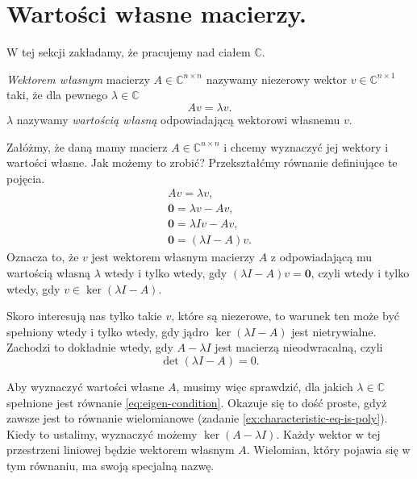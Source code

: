 \section{Wartości własne macierzy.}

W tej sekcji zakładamy, że pracujemy nad ciałem $\mathbb{C}$.


\begin{definition}
	\textit{Wektorem własnym} macierzy $A \in \mathbb{C}^{n \times n}$
		nazywamy niezerowy wektor $v \in \mathbb{C}^{n \times 1}$ taki,
		że dla pewnego $\lambda \in \mathbb{C}$
	\begin{equation}
		Av = \lambda v.
	\end{equation}
	$\lambda$ nazywamy \textit{wartością własną} odpowiadającą wektorowi własnemu $v$.
\end{definition}

Załóżmy,
	że daną mamy macierz $A \in \mathbb{C}^{n \times n}$
	i chcemy wyznaczyć jej wektory i wartości własne.
Jak możemy to zrobić?
Przekształćmy równanie definiujące te pojęcia.
\begin{align}
	Av = \lambda v, \\
	\textbf{0} = \lambda v - Av, \\
	\textbf{0} = \lambda I v - Av, \\
	\textbf{0} = (\lambda I - A) v.
\end{align}
Oznacza to,
	że $v$ jest wektorem własnym macierzy $A$ z odpowiadającą mu wartością własną $\lambda$
	wtedy i tylko wtedy, gdy $(\lambda I - A) v = \textbf{0}$,
	czyli wtedy i tylko wtedy, gdy $v \in \ker(\lambda I - A)$.

Skoro interesują nas tylko takie $v$,
	które są niezerowe,
	to warunek ten może być spełniony wtedy i tylko wtedy,
	gdy jądro $\ker(\lambda I - A)$ jest nietrywialne.
Zachodzi to dokładnie wtedy,
	gdy $A - \lambda I$ jest macierzą nieodwracalną,
	czyli
\begin{equation}\label{eq:eigen-condition}
	\det(\lambda I - A) = 0.
\end{equation}

Aby wyznaczyć wartości własne $A$, musimy więc sprawdzić,
	dla jakich $\lambda \in \mathbb{C}$ spełnione jest równanie \ref{eq:eigen-condition}.
Okazuje się to dość proste, gdyż zawsze jest to równanie wielomianowe (zadanie \ref{ex:characteristic-eq-is-poly}).
Kiedy to ustalimy,
	wyznaczyć możemy $\ker(A - \lambda I)$.
Każdy wektor w tej przestrzeni liniowej będzie wektorem własnym $A$.
Wielomian,
	który pojawia się w tym równaniu, ma swoją specjalną nazwę.

